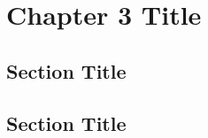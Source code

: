 \documentclass[../main.tex]{subfiles}
\begin{document}
\newpage
\onehalfspacing
\RaggedRight
\setcounter{chapter}{2}
\thesischapterstyle

\chapter{Chapter 3 Title}\label{chap3:short-label}

\section{Section Title}
\lipsum[1]

\section{Section Title}
\lipsum[2]
\end{document}
